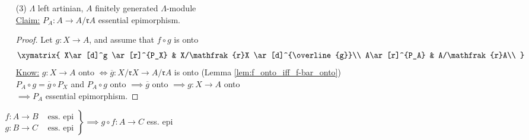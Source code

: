 \begin{defin}
\begin{exam}
\begin{enumerate}
\item[(3)] $\Lambda$ left artinian, $A$ finitely generated $\Lambda$-module\\
\underline{Claim:} $P_A : A \to A / \mathfrak{r}A$ essential epimorphism.
\begin{proof}
Let $g: X \to A$, and assume that $f \circ g$ is onto\\
$$
\xymatrix{
X\ar[d]^g \ar[r]^{P_X} & X/\mathfrak{r}X \ar[d]^{\overline{g}}\\
A\ar[r]^{P_A} & A/\mathfrak{r}A\\
}
$$
\underline{Know:} $g: X \to A$ onto $\iff \overline{g}: X / \mathfrak{r} X \to A / \mathfrak{r}A$ is onto (Lemma \ref{lem:f_onto_iff_f-bar_onto})\\
$P_A \circ g = \overline{g}\circ P_X$ and $P_A \circ g$ onto $\implies \overline{g}$ onto $\implies g:X \to A$ onto \\
$\implies P_A$ essential epimorphism.

\end{proof}

\end{enumerate}
\end{exam}
\end{defin}

\begin{exer}
$\left.
\begin{matrix}
f: A \to B & \text{ ess. epi}\\
g: B \to C & \text{ ess. epi}
\end{matrix}  
\right\rbrace \implies g\circ f : A \to C$ ess. epi
\end{exer}

